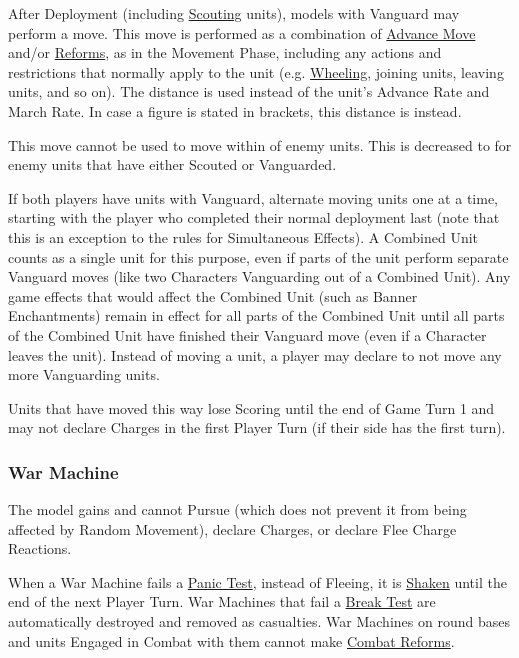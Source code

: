 After Deployment (including \hyperref[scout]{Scouting} units), models with Vanguard may perform a  move. This move is performed as a combination of \hyperref[advance_move]{Advance Move} and/or \hyperref[reform]{Reforms}, as in the Movement Phase, including any actions and restrictions that normally apply to the unit (e.g. \hyperref[pivots_and_wheels]{Wheeling}, joining units, leaving units, and so on). The  distance is used instead of the unit's Advance Rate and March Rate. In case a figure is stated in brackets, this distance is  instead.

This move cannot be used to move within  of enemy units. This is decreased to  for enemy units that have either Scouted or Vanguarded.

If both players have units with Vanguard, alternate moving units one at a time, starting with the player who completed their normal deployment last (note that this is an exception to the rules for Simultaneous Effects). A Combined Unit counts as a single unit for this purpose, even if parts of the unit perform separate Vanguard moves (like two Characters Vanguarding out of a Combined Unit). Any game effects that would affect the Combined Unit (such as Banner Enchantments) remain in effect for all parts of the Combined Unit until all parts of the Combined Unit have finished their Vanguard move (even if a Character leaves the unit). Instead of moving a unit, a player may declare to not move any more Vanguarding units.

Units that have moved this way lose Scoring until the end of Game Turn 1 and may not declare Charges in the first Player Turn (if their side has the first turn).

\subsubsection{War Machine}
\idx[main=y]{\warmachine}\label{war_machine}

The model gains \textbf{\exclusive{}} and cannot Pursue (which does not prevent it from being affected by Random Movement), declare Charges, or declare Flee Charge Reactions.

When a War Machine fails a \hyperref[panic_test]{Panic Test}, instead of Fleeing, it is \hyperref[shaken]{Shaken} until the end of the next Player Turn. War Machines that fail a \hyperref[break_test]{Break Test} are automatically destroyed and removed as casualties. War Machines on round bases and units Engaged in Combat with them cannot make \hyperref[combat_reform]{Combat Reforms}.

